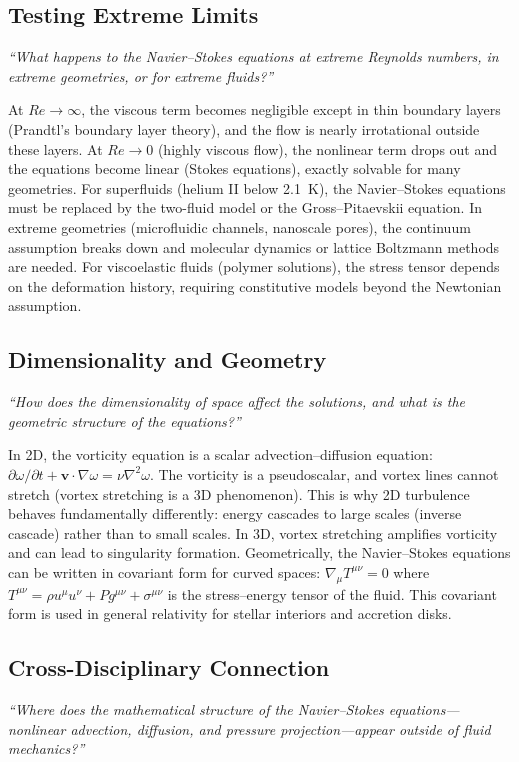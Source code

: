 \documentclass[11pt,openright]{book}
\begin{document}
\subsection*{Testing Extreme Limits}
\textit{``What happens to the Navier--Stokes equations at extreme Reynolds numbers, in extreme geometries, or for extreme fluids?''}

At $Re \to \infty$, the viscous term becomes negligible except in thin boundary layers (Prandtl's boundary layer theory), and the flow is nearly irrotational outside these layers. At $Re \to 0$ (highly viscous flow), the nonlinear term drops out and the equations become linear (Stokes equations), exactly solvable for many geometries. For superfluids (helium II below 2.1~K), the Navier--Stokes equations must be replaced by the two-fluid model or the Gross--Pitaevskii equation. In extreme geometries (microfluidic channels, nanoscale pores), the continuum assumption breaks down and molecular dynamics or lattice Boltzmann methods are needed. For viscoelastic fluids (polymer solutions), the stress tensor depends on the deformation history, requiring constitutive models beyond the Newtonian assumption.

\subsection*{Dimensionality and Geometry}
\textit{``How does the dimensionality of space affect the solutions, and what is the geometric structure of the equations?''}

In 2D, the vorticity equation is a scalar advection--diffusion equation: $\partial\omega/\partial t + \mathbf{v}\cdot\nabla\omega = \nu\nabla^{2}\omega$. The vorticity is a pseudoscalar, and vortex lines cannot stretch (vortex stretching is a 3D phenomenon). This is why 2D turbulence behaves fundamentally differently: energy cascades to large scales (inverse cascade) rather than to small scales. In 3D, vortex stretching amplifies vorticity and can lead to singularity formation. Geometrically, the Navier--Stokes equations can be written in covariant form for curved spaces: $\nabla_{\mu}T^{\mu\nu} = 0$ where $T^{\mu\nu} = \rho u^{\mu}u^{\nu} + Pg^{\mu\nu} + \sigma^{\mu\nu}$ is the stress--energy tensor of the fluid. This covariant form is used in general relativity for stellar interiors and accretion disks.

\subsection*{Cross-Disciplinary Connection}
\textit{``Where does the mathematical structure of the Navier--Stokes equations---nonlinear advection, diffusion, and pressure projection---appear outside of fluid mechanics?''}
\end{document}
